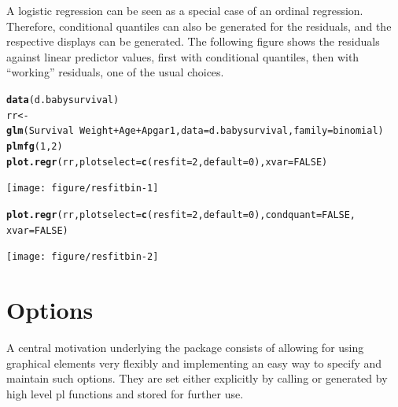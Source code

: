 \documentclass[11pt]{article}\usepackage[]{graphicx}\usepackage[]{color}
\makeatletter
\newcommand{\hlnum}[1]{\textcolor[rgb]{0.686,0.059,0.569}{#1}}%
\newcommand{\hlopt}[1]{\textcolor[rgb]{0,0,0}{#1}}%
\newcommand{\hlstd}[1]{\textcolor[rgb]{0.345,0.345,0.345}{#1}}%
\newcommand{\hlkwb}[1]{\textcolor[rgb]{0.69,0.353,0.396}{#1}}%
\newcommand{\hlkwc}[1]{\textcolor[rgb]{0.333,0.667,0.333}{#1}}%
\newcommand{\hlkwd}[1]{\textcolor[rgb]{0.737,0.353,0.396}{\textbf{#1}}}%
\newenvironment{kframe}{%
 \def\at@end@of@kframe{}%
 \ifinner\ifhmode%
  \def\at@end@of@kframe{\end{minipage}}%
  \begin{minipage}{\columnwidth}%
 \fi\fi%
 \def\FrameCommand##1{\hskip\@totalleftmargin \hskip-\fboxsep
 \colorbox{shadecolor}{##1}\hskip-\fboxsep
     \hskip-\linewidth \hskip-\@totalleftmargin \hskip\columnwidth}%
 \MakeFramed {\advance\hsize-\width
   \@totalleftmargin\z@ \linewidth\hsize
   \@setminipage}}%
 {\par\unskip\endMakeFramed%
 \at@end@of@kframe}
\newenvironment{knitrout}{}{} %
\makeatother
\begin{document}
A logistic regression can be seen as a special case of an ordinal regression.
Therefore, conditional quantiles can also be generated for the residuals,
and the respective displays can be generated.
The following figure shows the residuals against linear predictor values,
first with conditional quantiles, then with ``working'' residuals,
one of the usual choices.

\begin{knitrout}
\color{fgcolor}\begin{kframe}
\begin{alltt}
  \hlkwd{data}\hlstd{(d.babysurvival)}
  \hlstd{rr} \hlkwb{<-} \hlkwd{glm}\hlstd{(Survival}\hlopt{~}\hlstd{Weight}\hlopt{+}\hlstd{Age}\hlopt{+}\hlstd{Apgar1,}\hlkwc{data}\hlstd{=d.babysurvival,}\hlkwc{family}\hlstd{=binomial)}
  \hlkwd{plmfg}\hlstd{(}\hlnum{1}\hlstd{,}\hlnum{2}\hlstd{)}
  \hlkwd{plot.regr}\hlstd{(rr,} \hlkwc{plotselect}\hlstd{=}\hlkwd{c}\hlstd{(}\hlkwc{resfit}\hlstd{=}\hlnum{2}\hlstd{,} \hlkwc{default}\hlstd{=}\hlnum{0}\hlstd{),} \hlkwc{xvar}\hlstd{=}\hlnum{FALSE}\hlstd{)}
\end{alltt}
\end{kframe}
\texttt{[image: figure/resfitbin-1]} 
\begin{kframe}\begin{alltt}
  \hlkwd{plot.regr}\hlstd{(rr,} \hlkwc{plotselect}\hlstd{=}\hlkwd{c}\hlstd{(}\hlkwc{resfit}\hlstd{=}\hlnum{2}\hlstd{,} \hlkwc{default}\hlstd{=}\hlnum{0}\hlstd{),} \hlkwc{condquant}\hlstd{=}\hlnum{FALSE}\hlstd{,}
            \hlkwc{xvar}\hlstd{=}\hlnum{FALSE}\hlstd{)}
\end{alltt}
\end{kframe}
\texttt{[image: figure/resfitbin-2]} 

\end{knitrout}


\section{Options}
A central motivation underlying the  package consists of
allowing for using graphical elements very flexibly and implementing an
easy way to specify and maintain such options.
They are set either explicitly by calling  or generated
by high level pl functions and stored for further use.
\end{document}
